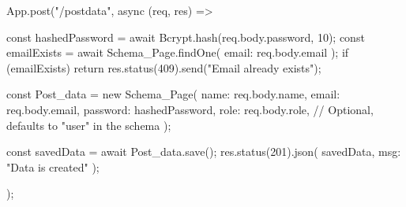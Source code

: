 App.post("/postdata", async (req, res) => {
    const hashedPassword = await Bcrypt.hash(req.body.password, 10);
    const emailExists = await Schema_Page.findOne({ email: req.body.email });
    if (emailExists) {
        return res.status(409).send("Email already exists");
    }


    const Post_data = new Schema_Page({
        name: req.body.name,
        email: req.body.email,
        password: hashedPassword,
        role: req.body.role, // Optional, defaults to "user" in the schema
    });


    const savedData = await Post_data.save();
    res.status(201).json({ savedData, msg: "Data is created" });
});

